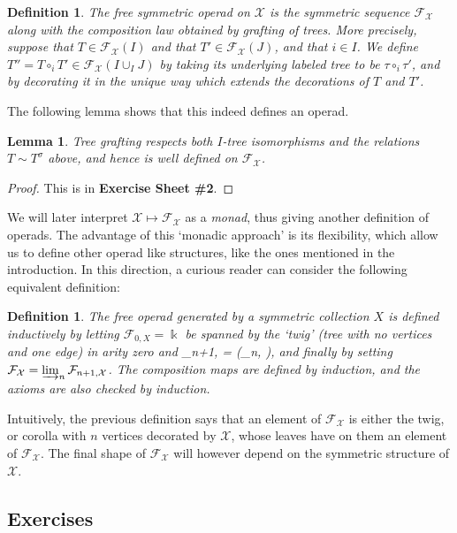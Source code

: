 \documentclass[fleqn,a4paper, twoside]{article}
\makeatletter
\newcommand{\0}{\langle 0\rangle}
\newcommand{\XX}{\mathcal{X}}
\newcommand{\FF}{\mathcal{F}}
\let\[\@undefined
\DeclareRobustCommand{\[}{\begin{equation}}%
\let\]\@undefined
\DeclareRobustCommand{\]}{\end{equation}}%
\theoremstyle{mytheorem}
\newtheorem{lemma}[theorem]{Lemma}
\theoremstyle{introthm}
\theoremstyle{mydefinition}
\newtheorem{definition}[theorem]{Definition}
\theoremstyle{mydefinition2}
\theoremstyle{plain} %
\newcommand{\?}{\,?\,}
\newcommand{\kk}{\Bbbk}
\theoremstyle{mytheorem}
\theoremstyle{plain} %
\makeatother
\begin{document}
\begin{definition}
The \emph{free symmetric operad} on $\XX$ is the
symmetric sequence $\FF_\XX$ along with the composition
law obtained by grafting of trees. More precisely,
suppose that $T\in \FF_\XX(I)$ and that $T'\in\FF_\XX(J)$,
and that $i\in I$. We define $T'' =T\circ_i T' \in 
\FF_\XX(I\cup_I J)$ by taking its underlying labeled
tree to be $\tau\circ_i \tau'$, and by decorating it
in the unique way which extends the decorations of 
$T$ and $T'$.
\end{definition}

The following lemma shows that this indeed defines an operad.

\begin{lemma}
Tree grafting respects both $I$-tree 
isomorphisms and the relations $T\sim T^\sigma$
above, and hence is well defined on $\FF_\XX$.
\end{lemma}

\begin{proof}
This is in \textbf{Exercise Sheet \#2}. 
\end{proof}

 We will later
interpret $\XX\longmapsto \FF_\XX$ as a \emph{monad},
thus giving another definition of operads. The
advantage of this `monadic approach' is its 
flexibility, which allow us to define other
operad like structures, like the ones 
mentioned in the introduction.
In this direction, a curious reader 
can consider the following 
equivalent definition:

\begin{definition}
The free operad generated by a symmetric
collection $X$ is defined inductively by
letting  $\FF_{0,X}=\kk$ be spanned
by the `twig' (tree with no vertices and one edge)
in arity zero and
\[ \FF_{n+1,\XX} = \kk\oplus (\XX\circ  \FF_{n,\XX} ), \]
and finally by setting
$\FF_\XX = \varinjlim_n \FF_{n+1,\XX}$.
The composition maps are defined by induction,
and the axioms are also checked by induction.
\end{definition}

Intuitively, the previous definition says that an element of
$\FF_\XX$ is either the twig, or corolla
with $n$ vertices decorated by $\XX$, whose leaves
have on them an element of $\FF_\XX$. The
final shape of $\FF_\XX$ will however
depend on the symmetric structure of $ \XX$. 
 \subsection{Exercises}
\end{document}
